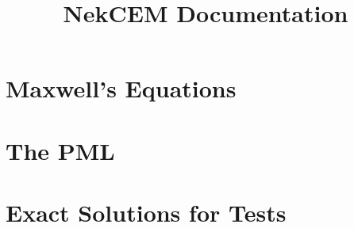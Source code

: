 \documentclass{article}
\title{NekCEM Documentation}
\begin{document}
\section{Maxwell's Equations}


\section{The PML}


\section{Exact Solutions for Tests}

\end{document}
